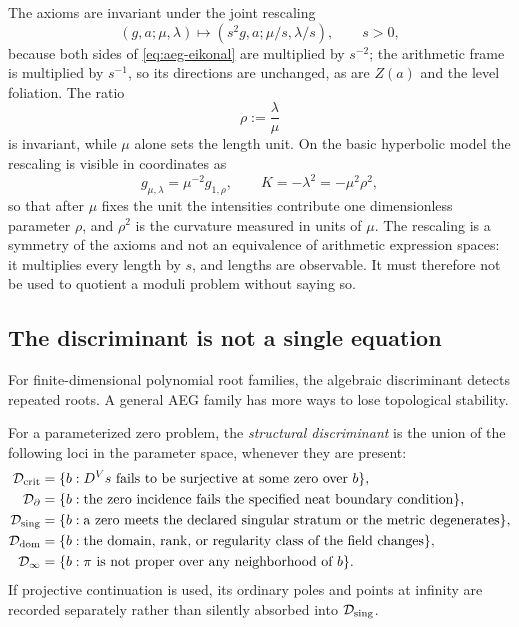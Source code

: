 \begin{remark}
\label{rem:intensity-plane-factorization}
The axioms are invariant under the joint rescaling
\begin{equation}
 (g,a;\mu,\lambda)\longmapsto(s^2g,a;\mu/s,\lambda/s),
 \qquad s>0,
 \label{eq:intensity-scaling}
\end{equation}
because both sides of \eqref{eq:aeg-eikonal} are multiplied by $s^{-2}$; the
arithmetic frame is multiplied by $s^{-1}$, so its directions are unchanged,
as are $Z(a)$ and the level foliation.  The ratio
\begin{equation}
 \rho:=\frac{\lambda}{\mu}
 \label{eq:intensity-ratio}
\end{equation}
is invariant, while $\mu$ alone sets the length unit.  On the basic hyperbolic
model the rescaling is visible in coordinates as
\begin{equation}
 g_{\mu,\lambda}=\mu^{-2}g_{1,\rho},
 \qquad
 K=-\lambda^2=-\mu^2\rho^2 ,
 \label{eq:intensity-factorization}
\end{equation}
so that after $\mu$ fixes the unit the intensities contribute one dimensionless
parameter $\rho$, and $\rho^2$ is the curvature measured in units of $\mu$.  The
rescaling is a symmetry of the axioms and not an equivalence of arithmetic
expression spaces: it multiplies every length by $s$, and lengths are observable.
It must therefore not be used to quotient a moduli problem without saying so.
\end{remark}

\subsection{The discriminant is not a single equation}

For finite-dimensional polynomial root families, the algebraic discriminant
detects repeated roots.  A general AEG family has more ways to lose topological
stability.

\begin{definition}
\label{def:structural-discriminant}
For a parameterized zero problem, the \emph{structural discriminant} is the union
of the following loci in the parameter space, whenever they are present:
\begin{align*}
 \mathcal D_{\mathrm{crit}}
   &=\{b:\text{$D^Vs$ fails to be surjective at some zero over $b$}\},\\
 \mathcal D_{\partial}
   &=\{b:\text{the zero incidence fails the specified neat boundary condition}\},\\
 \mathcal D_{\mathrm{sing}}
   &=\{b:\text{a zero meets the declared singular stratum or the metric degenerates}\},\\
 \mathcal D_{\mathrm{dom}}
   &=\{b:\text{the domain, rank, or regularity class of the field changes}\},\\
 \mathcal D_{\infty}
   &=\{b:\text{$\pi$ is not proper over any neighborhood of $b$}\}.
\end{align*}
If projective continuation is used, its ordinary poles and points at infinity are
recorded separately rather than silently absorbed into $\mathcal D_{\mathrm{sing}}$.
\end{definition}

